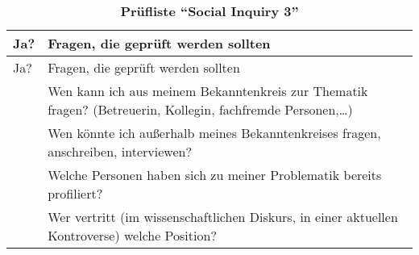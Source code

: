 \documentclass[]{article}
\begin{document}
\begin{longtable}[]{@{}ll@{}}
\caption{\textbf{Prüfliste ``Social Inquiry 3''}}\tabularnewline
\toprule
\begin{minipage}[b]{0.27\columnwidth}\raggedright\strut
Ja?\strut
\end{minipage} & \begin{minipage}[b]{0.67\columnwidth}\raggedright\strut
Fragen, die geprüft werden sollten\strut
\end{minipage}\tabularnewline
\midrule
\endfirsthead
\toprule
\begin{minipage}[b]{0.27\columnwidth}\raggedright\strut
Ja?\strut
\end{minipage} & \begin{minipage}[b]{0.67\columnwidth}\raggedright\strut
Fragen, die geprüft werden sollten\strut
\end{minipage}\tabularnewline
\midrule
\endhead
\begin{minipage}[t]{0.27\columnwidth}\raggedright\strut
\strut
\end{minipage} & \begin{minipage}[t]{0.67\columnwidth}\raggedright\strut
Wen kann ich aus meinem Bekanntenkreis zur Thematik fragen? (Betreuerin,
Kollegin, fachfremde Personen,\ldots{})\strut
\end{minipage}\tabularnewline
\begin{minipage}[t]{0.27\columnwidth}\raggedright\strut
\strut
\end{minipage} & \begin{minipage}[t]{0.67\columnwidth}\raggedright\strut
Wen könnte ich außerhalb meines Bekanntenkreises fragen, anschreiben,
interviewen?\strut
\end{minipage}\tabularnewline
\begin{minipage}[t]{0.27\columnwidth}\raggedright\strut
\strut
\end{minipage} & \begin{minipage}[t]{0.67\columnwidth}\raggedright\strut
Welche Personen haben sich zu meiner Problematik bereits
profiliert?\strut
\end{minipage}\tabularnewline
\begin{minipage}[t]{0.27\columnwidth}\raggedright\strut
\strut
\end{minipage} & \begin{minipage}[t]{0.67\columnwidth}\raggedright\strut
Wer vertritt (im wissenschaftlichen Diskurs, in einer aktuellen
Kontroverse) welche Position?\strut
\end{minipage}\tabularnewline

\end{longtable}
\end{document}
